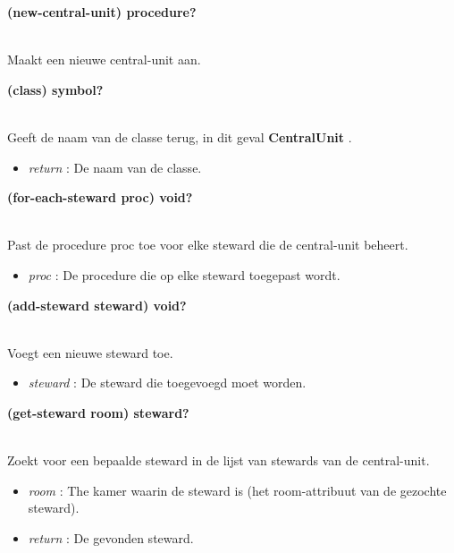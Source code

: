 \documentclass{article}
\newcommand{\ar}{\ding{213} }
\newcommand{\code}[1]{\textcolor{code}{#1}}
\newcommand{\lb}[1][]{\code{(#1}}
\newcommand{\rb}{\code{)}}
\newcommand{\racket}[1]{
	{\color{blue}\textbf{#1}}
}
\begin{document}
\begin{framed}
	\hypertarget{central-unit:new-central-unit}{\racket{\lb[new-central-unit]\rb \ar \code{procedure?}}}
	\\Maakt een nieuwe central-unit aan.
\end{framed}

\begin{framed}
	\hypertarget{central-unit:class}{\racket{\lb[class]\rb \ar \code{symbol?}}}
	\\Geeft de naam van de classe terug, in dit geval \racket{CentralUnit}.
	\begin{itemize}
		\item \emph{return} : De naam van de classe.
	\end{itemize}
\end{framed}

\begin{framed}
	\hypertarget{central-unit:for-each-steward}{\racket{\lb[for-each-steward] proc\rb \ar \code{void?}}}
	\\Past de procedure proc toe voor elke steward die de central-unit beheert.
	\begin{itemize}
		\item \emph{proc} : De procedure die op elke steward toegepast wordt.
	\end{itemize}
\end{framed}

\begin{framed}
	\hypertarget{central-unit:add-steward}{\racket{\lb[add-steward] steward\rb \ar \code{void?}}}
	\\Voegt een nieuwe steward toe.
	\begin{itemize}
		\item \emph{steward} : De steward die toegevoegd moet worden.
	\end{itemize}
\end{framed}

\begin{framed}
	\hypertarget{central-unit:get-steward}{\racket{\lb[get-steward] room\rb \ar \code{steward?}}}
	\\Zoekt voor een bepaalde steward in de lijst van stewards van de central-unit.
	\begin{itemize}
		\item \emph{room} : The kamer waarin de steward is (het room-attribuut van de gezochte steward).
		\item \emph{return} : De gevonden steward.
	\end{itemize}
\end{framed}
\end{document}
